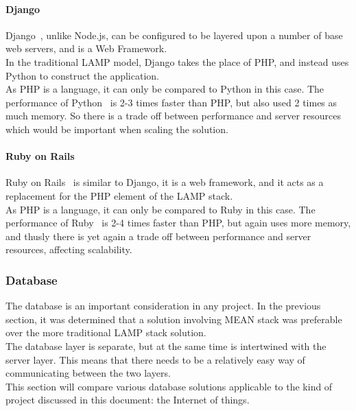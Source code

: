 \documentclass[preprint,12pt,3p]{elsarticle}
\begin{document}
\paragraph{Django}
Django~\cite{django}, unlike Node.js, can be configured to be layered upon a number of base web servers, and is a Web Framework.\\
In the traditional LAMP model, Django takes the place of PHP, and instead uses Python to construct the application.\\
As PHP is a language, it can only be compared to Python in this case. The performance of Python~\cite{djangovsphp} is 2-3 times faster than PHP, but also used 2 times as much memory. So there is a trade off between performance and server resources which would be important when scaling the solution.

\paragraph{Ruby on Rails}
Ruby on Rails~\cite{ruby} is similar to Django, it is a web framework, and it acts as a replacement for the PHP element of the LAMP stack.\\
As PHP is a language, it can only be compared to Ruby in this case. The performance of Ruby~\cite{rubyvsphp} is 2-4 times faster than PHP, but again uses more memory, and thusly there is yet again a trade off between performance and server resources, affecting scalability.


\subsubsection{Database}
The database is an important consideration in any project. In the previous section, it was determined that a solution involving MEAN stack was preferable over the more traditional LAMP stack solution.\\
The database layer is separate, but at the same time is intertwined with the server layer. This means that there needs to be a relatively easy way of communicating between the two layers.\\
This section will compare various database solutions applicable to the kind of project discussed in this document: the Internet of things.\\
\end{document}
